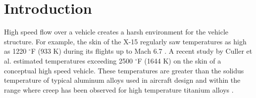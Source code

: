 \documentclass[conf]{new-aiaa}
\begin{document}
\section{Introduction} %

High speed flow over a vehicle creates a harsh environment for 
the vehicle structure.
For example, the skin of the X-15 regularly saw temperatures
as high as 1220 $^{\circ}$F (933 K)
during its flights up to Mach 6.7
\cite{ kordes_structureal_heating_experiencs_on_the_x15_airplane}.
A recent study by Culler et al.
\cite{ culler_impact_of_FTS_coupling_on_response_prediction_hypersonic_skin_panels}
estimated temperatures exceeding 2500 $^\circ$F (1644 K) 
on the skin of a conceptual high speed vehicle.
These temperatures are greater than the solidus 
temperature of typical aluminum alloys used in aircraft design
\cite{ SAE_metals_and_alloys_in_the_unified_numbering_system}
and within the range where creep has been observed for 
high temperature titanium alloys 
\cite{
  evans_effects_of_alpha_case_formation_on_creep_fracture_properties_of_the_high_temperature_titanium_alloy_IMI834,
  lavina_creep_behavior_of_Ti6Al4V_from_450C_to_600C}.
\end{document}
